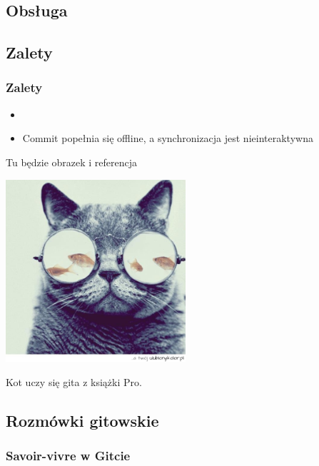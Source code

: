 \documentclass{beamer}
\begin{document}
\subsection{Obsługa}

\subsection{Zalety}
\begin{frame}
\frametitle{Zalety}
\begin{itemize}
 \item 
 \item Commit popełnia się offline, a synchronizacja jest nieinteraktywna
\end{itemize}
 
\end{frame}

\begin{frame}[c]{Tu będzie obrazek i referencja}
  \begin{center}
    \includegraphics[width=0.5\textwidth]{./obrazki/kot.jpg}

    Kot uczy się gita z książki Pro.
  \end{center}
\end{frame}

\subsection{Rozmówki gitowskie}
\begin{frame}
 \frametitle{Savoir-vivre w Gitcie}
\end{frame}
\end{document}
